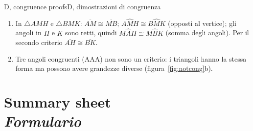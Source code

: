 \documentclass[10pt,a4paper,oneside]{book}
\newcommand{\bichapter}[2]{%
  \chapter[#1 \textperiodcentered\ #2]{#1\\[2pt]{\color{itgreen}\itshape #2}}}
\newcommand{\ang}[3]{#1\widehat{#2}#3}      %
\newcommand{\seg}[1]{\overline{#1}}         %
\newcommand{\tri}[1]{\triangle #1}          %
\begin{document}
\begin{solution}{D, congruence proofs}{D, dimostrazioni di congruenza}
\begin{enumerate}[label=\textbf{D\arabic*.}, leftmargin=2.2em]
\item In $\tri{AMH}$ e $\tri{BMK}$: $\seg{AM} \cong \seg{MB}$; $\ang{A}{M}{H} \cong \ang{B}{M}{K}$ (opposti al vertice); gli angoli in $H$ e $K$ sono retti, quindi $\ang{M}{A}{H} \cong \ang{M}{B}{K}$ (somma degli angoli). Per il secondo criterio $\seg{AH} \cong \seg{BK}$.
\item Tre angoli congruenti (AAA) non sono un criterio: i triangoli hanno la stessa forma ma possono avere grandezze diverse (figura~\ref{fig:notcong}b).
\end{enumerate}
\end{solution}


\bichapter{Summary sheet}{Formulario}\label{app:summary}
\end{document}
